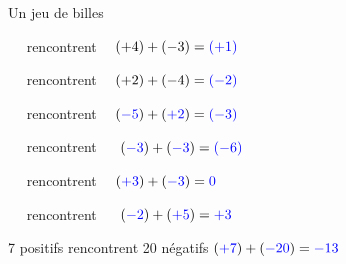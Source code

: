 \documentclass[a4paper,11pt]{report}
\begin{document}
\begin{resolu}{Un jeu de billes}
{\begin{tasks}
\vspace*{.5cm}

\bverte\bverte\bverte\bverte$\quad$ rencontrent $\quad$\brouge\brouge\brouge \hfill $(+4)+(-3) = {\color{blue}(+1)}$

\vspace*{.5cm}

\bverte\bverte$\quad$ rencontrent $\quad$\brouge\brouge\brouge\brouge \hfill $(+2)+(-4) = {\color{blue}(-2)}$

\vspace*{.5cm}

\brouge\brouge\brouge\brouge\brouge$\quad$ rencontrent $\quad$\bverte\bverte \hfill $({\color{blue}-5})+({\color{blue}+2}) = {\color{blue}(-3)}$

\vspace*{.5cm}

\brouge\brouge\brouge$\quad$ rencontrent $\quad$ \brouge\brouge\brouge \hfill $({\color{blue}-3})+({\color{blue}-3}) = {\color{blue}(-6)}$

\vspace*{.5cm}

\bverte\bverte\bverte$\quad$ rencontrent $\quad$\brouge\brouge\brouge \hfill $({\color{blue}+3})+({\color{blue}-3}) = {\color{blue}0}$

\vspace*{.5cm}

\brouge\brouge$\quad$ rencontrent $\quad$ \bverte\bverte\bverte\bverte\bverte \hfill $({\color{blue}-2})+({\color{blue}+5}) = {\color{blue}+3}$

\vspace*{.5cm}

7 positifs rencontrent 20 négatifs \hfill $({\color{blue}+7})+({\color{blue}-20}) = {\color{blue}-13}$

\vspace*{.5cm}


\end{tasks}}
\end{resolu}
\end{document}

